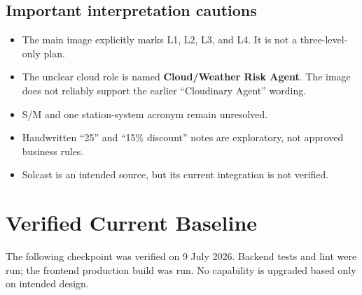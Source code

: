 \documentclass[11pt,a4paper]{article}
\begin{document}
\subsection{Important interpretation cautions}

\begin{itemize}
  \item The main image explicitly marks L1, L2, L3, and L4. It is not a three-level-only plan.
  \item The unclear cloud role is named \textbf{Cloud/Weather Risk Agent}. The image does not
        reliably support the earlier ``Cloudinary Agent'' wording.
  \item S/M and one station-system acronym remain unresolved.
  \item Handwritten ``25'' and ``15\% discount'' notes are exploratory, not approved business rules.
  \item Solcast is an intended source, but its current integration is not verified.
\end{itemize}

\section{Verified Current Baseline}

The following checkpoint was verified on 9 July 2026. Backend tests and lint were run;
the frontend production build was run. No capability is upgraded based only on intended design.
\end{document}
